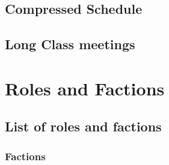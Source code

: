 \begin{refsection}
\section{Compressed Schedule}
\label{compressedschedule}

\section{Long Class meetings}
\label{longclassmeetings}

\pagebreak 

\chapter{Roles and Factions}
\label{rolesandfactions}

\section{List of roles and factions}
\label{listofrolesandfactions}

\subsection{Factions}
\label{factions}


\end{refsection}
